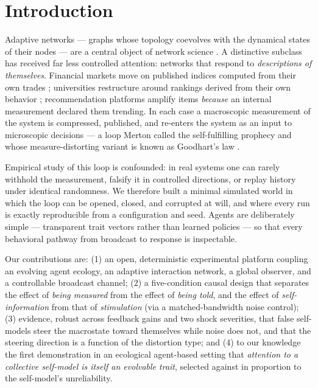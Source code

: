 \documentclass[10pt]{article}
\begin{document}
\section{Introduction}
Adaptive networks --- graphs whose topology coevolves with the dynamical states
of their nodes --- are a central object of network science
\cite{gross2008adaptive,holme2012temporal}. A distinctive subclass has received
far less controlled attention: networks that respond to \emph{descriptions of
themselves}. Financial markets move on published indices computed from their
own trades \cite{soros2013fallibility}; universities restructure around
rankings derived from their own behavior \cite{espeland2007rankings};
recommendation platforms amplify items \emph{because} an internal measurement
declared them trending. In each case a macroscopic measurement of the system is
compressed, published, and re-enters the system as an input to microscopic
decisions --- a loop Merton called the self-fulfilling prophecy
\cite{merton1948self} and whose measure-distorting variant is known as
Goodhart's law \cite{strathern1997improving}.

Empirical study of this loop is confounded: in real systems one can rarely
withhold the measurement, falsify it in controlled directions, or replay
history under identical randomness. We therefore built a minimal simulated
world in which the loop can be opened, closed, and corrupted at will, and
where every run is exactly reproducible from a configuration and seed. Agents
are deliberately simple --- transparent trait vectors rather than learned
policies --- so that every behavioral pathway from broadcast to response is
inspectable.

Our contributions are: (1) an open, deterministic experimental platform
coupling an evolving agent ecology, an adaptive interaction network, a global
observer, and a controllable broadcast channel; (2) a five-condition causal
design that separates the effect of \emph{being measured} from the effect of
\emph{being told}, and the effect of \emph{self-information} from that of
\emph{stimulation} (via a matched-bandwidth noise control); (3) evidence,
robust across feedback gains and two shock severities, that false self-models
steer the macrostate toward themselves while noise does not, and that the
steering direction is a function of the distortion type; and (4) to our
knowledge the first demonstration in an ecological agent-based setting that
\emph{attention to a collective self-model is itself an evolvable trait},
selected against in proportion to the self-model's unreliability.
\end{document}
